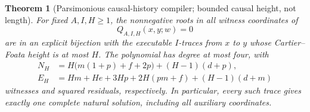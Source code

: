 \documentclass[11pt,a4paper]{article}
\newtheorem{theorem}{Theorem}[section]
\theoremstyle{definition}
\theoremstyle{remark}
\begin{document}
\begin{theorem}[Parsimonious causal-history compiler; bounded causal height, not length]\label{cdc:ct:thm:history}
For fixed $A,I,H\ge1$, the nonnegative roots in all witness coordinates of
\[
 Q_{A,I,H}(x,y;w)=0
\]
are in an explicit bijection with the executable $I$-traces from $x$ to $y$ whose Cartier--Foata height is at most $H$. The polynomial has degree at most four, with
\begin{align}
 N_H&=H\bigl(m(1+p)+f+2p\bigr)+(H-1)(d+p),\label{cdc:ct:eq:history-N}\\
 E_H&=Hm+He+3Hp+2H(pm+f)+(H-1)(d+m)\label{cdc:ct:eq:history-E}
\end{align}
witnesses and squared residuals, respectively. In particular, every such trace gives exactly one complete natural solution, including all auxiliary coordinates.
\end{theorem}
\end{document}
